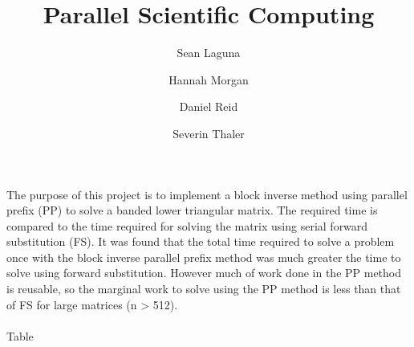 \documentclass[a4paper,12pt]{article}
\title{Parallel Scientific Computing}
\author{Sean Laguna  \\
	\and 
	Hannah Morgan \\
	\and
	Daniel Reid \\
	\and
	Severin Thaler \\
	}
\date{\vspace{-5ex}}
\begin{document}
\maketitle



\paragraph*{}
	The purpose of this project is to implement a block inverse method using parallel prefix (PP) to solve a banded lower triangular matrix.  The required time is compared to the time required for solving the matrix using serial forward substitution (FS).  It was found that the total time required to solve a problem once with the block inverse parallel prefix  method was much greater the time to solve using forward substitution.  However much of work done in the PP method is reusable, so the marginal work to solve using the PP method is less than that of FS for large matrices (n > 512).

\paragraph*{}
	Table 
	
	  
\end{document}
